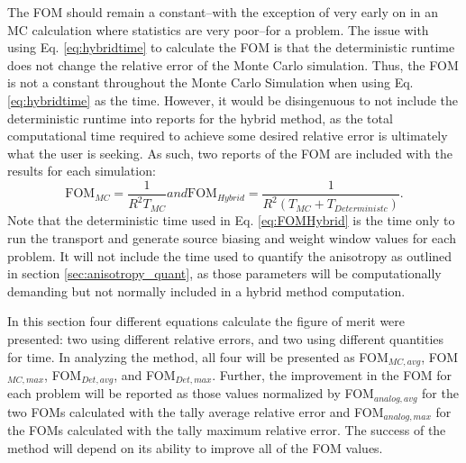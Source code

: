 The FOM should remain a constant--with the exception of very early on in an MC
calculation where statistics are very poor--for a problem. The issue with using
Eq. \ref{eq:hybridtime} to calculate the FOM is that the deterministic runtime
does not change the relative error of the Monte Carlo simulation. Thus, the FOM
is not a constant throughout the Monte Carlo Simulation when using Eq.
\ref{eq:hybridtime} as the time.
However, it would be disingenuous to not include the deterministic runtime into
reports for the hybrid method, as the total computational time required to
achieve some desired relative error is ultimately what the user is seeking. As
such, two reports of the FOM are included with the results for each simulation:
\begin{subequations}
  \begin{equation}
    \text{FOM}_{MC} = \frac{1}{R^{2}T_{MC}}
  \label{eq:FOMMC}
  \end{equation}
and
  \begin{equation}
    \text{FOM}_{Hybrid} = \frac{1}{R^{2}(T_{MC} + T_{Deterministc})} .
  \label{eq:FOMHybrid}
  \end{equation}
  \label{eq:FOMtime}
\end{subequations}
Note that the deterministic time used in Eq. \ref{eq:FOMHybrid} is the time only
to run the transport and generate source biasing and weight window values for
each problem. It will not include the time used to quantify the anisotropy as
outlined in section \ref{sec:anisotropy_quant}, as those parameters will be
computationally demanding but not normally included in a hybrid method
computation.

In this section four different equations calculate the figure of merit were presented: two
using different relative errors, and two using different quantities
for time. In analyzing the method, all four will be presented as FOM$_{MC,avg}$,
FOM$_{MC,max}$, FOM$_{Det,avg}$, and FOM$_{Det,max}$. Further, the improvement
in the FOM for each problem will be reported as those values normalized by
FOM$_{analog,avg}$ for the two FOMs calculated with the tally average relative
error and FOM$_{analog,max}$ for the FOMs calculated with the tally maximum
relative error. The success of the method will depend on its ability to improve
all of the FOM values.

